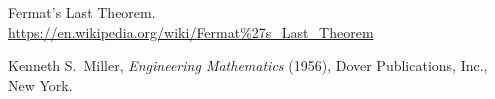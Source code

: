 \documentclass[12pt]{article}
\numberwithin{equation}{section}
\begin{document}




\begin{thebibliography}{9}


    Fermat's Last Theorem. \newline
    \url{https://en.wikipedia.org/wiki/Fermat%27s_Last_Theorem}

Kenneth S.~Miller, \textit{Engineering Mathematics} (1956), Dover Publications, Inc., New York.




















\end{thebibliography}


\end{document}
